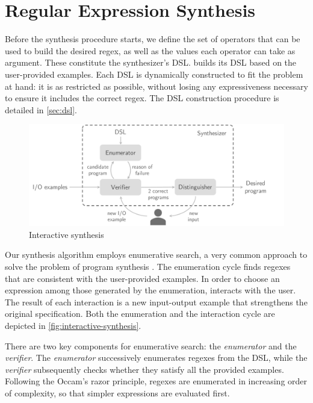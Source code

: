 \chapter{Regular Expression Synthesis}\label{chap:regex-synthesis}

Before the synthesis procedure starts, we define the set of operators that can be used to build the desired regex, as well as the values each operator can take as argument. These constitute the synthesizer's \ac{DSL}. \Forest{} builds its DSL based on the user-provided examples. Each DSL is dynamically constructed to fit the problem at hand: it is as restricted as possible, without losing any expressiveness necessary to ensure it includes the correct regex. The DSL construction procedure is detailed in \autoref{sec:dsl}.

\begin{figure}
    \centering
    \includegraphics[width=.9\linewidth]{pictures/interactive_synthesis.pdf}
    \caption{Interactive synthesis}
    \label{fig:interactive-synthesis}
\end{figure}

Our synthesis algorithm employs enumerative search, a very common approach to solve the problem of program synthesis . The enumeration cycle finds regexes that are consistent with the user-provided examples. In order to choose an expression among those generated by the enumeration,  \Forest{} interacts with the user. The result of each interaction is a new input-output example that strengthens the original specification. Both the enumeration and the interaction cycle are depicted in \autoref{fig:interactive-synthesis}.

There are two key components for enumerative search: the \textit{enumerator} and the \textit{verifier}.
The \textit{enumerator} successively enumerates regexes from the DSL, while the \textit{verifier} subsequently checks whether they satisfy all the provided examples.
%
Following the Occam's razor principle, regexes are enumerated in increasing order of complexity, so that simpler expressions are evaluated first. %


